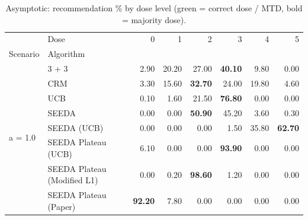 \begin{table}[H]
\centering
\caption{Asymptotic: recommendation \% by dose level (green = correct dose / MTD, bold = majority dose).}
\label{tab:asym_rec_by_dose}
\begin{tabular}{llrrrrrr}
\toprule
 & Dose & 0 & 1 & 2 & 3 & 4 & 5 \\
Scenario & Algorithm &  &  &  &  &  &  \\
\midrule
\multirow[c]{8}{*}{a = 1.0} & 3 + 3 & 2.90 & 20.20 & {\cellcolor[HTML]{C8E6C9}} 27.00 & \bfseries 40.10 & 9.80 & 0.00 \\
 & CRM & 3.30 & 15.60 & {\cellcolor[HTML]{C8E6C9}} \bfseries 32.70 & 24.00 & 19.80 & 4.60 \\
 & UCB & 0.10 & 1.60 & {\cellcolor[HTML]{C8E6C9}} 21.50 & \bfseries 76.80 & 0.00 & 0.00 \\
 & SEEDA & 0.00 & 0.00 & {\cellcolor[HTML]{C8E6C9}} \bfseries 50.90 & 45.20 & 3.60 & 0.30 \\
 & SEEDA (UCB) & 0.00 & 0.00 & {\cellcolor[HTML]{C8E6C9}} 0.00 & 1.50 & 35.80 & \bfseries 62.70 \\
 & SEEDA Plateau (UCB) & 6.10 & 0.00 & {\cellcolor[HTML]{C8E6C9}} 0.00 & \bfseries 93.90 & 0.00 & 0.00 \\
 & SEEDA Plateau (Modified L1) & 0.00 & 0.20 & {\cellcolor[HTML]{C8E6C9}} \bfseries 98.60 & 1.20 & 0.00 & 0.00 \\
 & SEEDA Plateau (Paper) & \bfseries 92.20 & 7.80 & {\cellcolor[HTML]{C8E6C9}} 0.00 & 0.00 & 0.00 & 0.00 \\
\bottomrule
\end{tabular}
\end{table}
